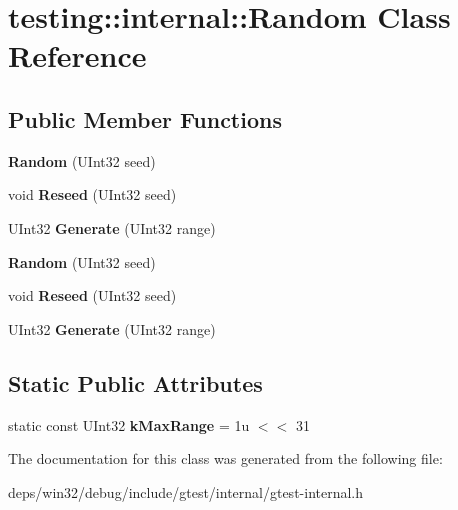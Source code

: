 \hypertarget{classtesting_1_1internal_1_1_random}{}\section{testing\+:\+:internal\+:\+:Random Class Reference}
\label{classtesting_1_1internal_1_1_random}
\subsection*{Public Member Functions}
\begin{DoxyCompactItemize}
\item 
\hypertarget{classtesting_1_1internal_1_1_random_a6e112be5e7cce00551f6383025f69460}{}{\bfseries Random} (U\+Int32 seed)\label{classtesting_1_1internal_1_1_random_a6e112be5e7cce00551f6383025f69460}

\item 
\hypertarget{classtesting_1_1internal_1_1_random_adf2f24199318a46f885c78f50d89a69e}{}void {\bfseries Reseed} (U\+Int32 seed)\label{classtesting_1_1internal_1_1_random_adf2f24199318a46f885c78f50d89a69e}

\item 
\hypertarget{classtesting_1_1internal_1_1_random_a9315b7fb621cbcfdf92ed4b5e584c0db}{}U\+Int32 {\bfseries Generate} (U\+Int32 range)\label{classtesting_1_1internal_1_1_random_a9315b7fb621cbcfdf92ed4b5e584c0db}

\item 
\hypertarget{classtesting_1_1internal_1_1_random_a6e112be5e7cce00551f6383025f69460}{}{\bfseries Random} (U\+Int32 seed)\label{classtesting_1_1internal_1_1_random_a6e112be5e7cce00551f6383025f69460}

\item 
\hypertarget{classtesting_1_1internal_1_1_random_adf2f24199318a46f885c78f50d89a69e}{}void {\bfseries Reseed} (U\+Int32 seed)\label{classtesting_1_1internal_1_1_random_adf2f24199318a46f885c78f50d89a69e}

\item 
\hypertarget{classtesting_1_1internal_1_1_random_a9315b7fb621cbcfdf92ed4b5e584c0db}{}U\+Int32 {\bfseries Generate} (U\+Int32 range)\label{classtesting_1_1internal_1_1_random_a9315b7fb621cbcfdf92ed4b5e584c0db}

\end{DoxyCompactItemize}
\subsection*{Static Public Attributes}
\begin{DoxyCompactItemize}
\item 
\hypertarget{classtesting_1_1internal_1_1_random_ad378599ead1173525f1d44b458a3450a}{}static const U\+Int32 {\bfseries k\+Max\+Range} = 1u $<$$<$ 31\label{classtesting_1_1internal_1_1_random_ad378599ead1173525f1d44b458a3450a}

\end{DoxyCompactItemize}


The documentation for this class was generated from the following file\+:\begin{DoxyCompactItemize}
\item 
deps/win32/debug/include/gtest/internal/gtest-\/internal.\+h\end{DoxyCompactItemize}
